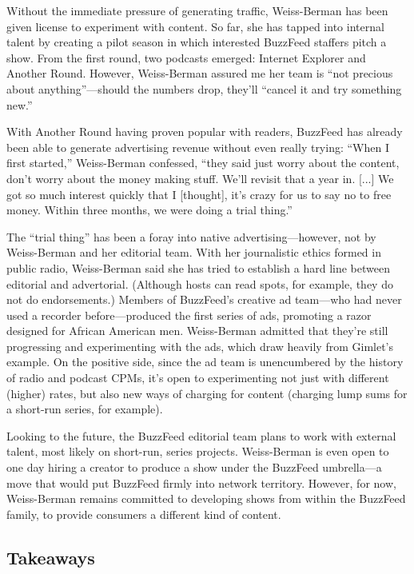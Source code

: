 \documentclass[notoc, symmetric, nobib, nols]{towcenter-guideto-book}
\begin{document}
Without the immediate pressure of generating traffic, Weiss-Berman has been given license to experiment with content. So far, she has tapped into internal talent by creating a pilot season in which interested BuzzFeed staffers pitch a show. From the first round, two podcasts emerged: Internet Explorer and Another Round. However, Weiss-Berman assured me her team is ``not precious about anything''---should the numbers drop, they'll ``cancel it and try something new.''\autocite{wb}

With Another Round having proven popular with readers, BuzzFeed has already been able to generate advertising revenue without even really trying: ``When I first started,'' Weiss-Berman confessed, ``they said just worry about the content, don't worry about the money making stuff. We'll revisit that a year in. [...] We got so much interest quickly that I [thought], it's crazy for us to say no to free money. Within three months, we were doing a trial thing.''\autocite{wb} 

The ``trial thing'' has been a foray into native advertising---however, not by Weiss-Berman and her editorial team. With her journalistic ethics formed in public radio, Weiss-Berman said she has tried to establish a hard line between editorial and advertorial. (Although hosts can read spots, for example, they do not do endorsements.) Members of BuzzFeed's creative ad team---who had never used a recorder before---produced the first series of ads, promoting a razor designed for African American men. Weiss-Berman admitted that they're still progressing and experimenting with the ads, which draw heavily from Gimlet's example. On the positive side, since the ad team is unencumbered by the history of radio and podcast CPMs, it's open to experimenting not just with different (higher) rates, but also new ways of charging for content (charging lump sums for a short-run series, for example).\autocite{wb}

Looking to the future, the BuzzFeed editorial team plans to work with external talent, most likely on short-run, series projects. Weiss-Berman is even open to one day hiring a creator to produce a show under the BuzzFeed umbrella---a move that would put BuzzFeed firmly into network territory. However, for now, Weiss-Berman remains committed to developing shows from within the BuzzFeed family, to provide consumers a different kind of content.\autocite{wb}

\subsection{Takeaways}
\end{document}
